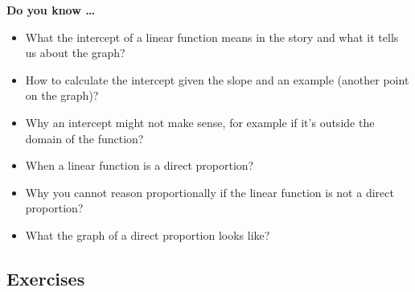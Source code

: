 
 

\noindent \textbf{Do you know \ldots}

\begin{itemize} 
\item What the intercept of a linear function means in the story and what it tells us about the graph? 
\item How to calculate the intercept given the slope and an example (another point on the graph)? 
\item Why an intercept might not make sense, for example if it's outside the domain of the function? 
\item When a linear function is a direct proportion? 
\item Why you cannot reason proportionally if the linear function is not a direct proportion? 
\item What the graph of a direct proportion looks like? 
 
\end{itemize}

\subsection*{Exercises}

